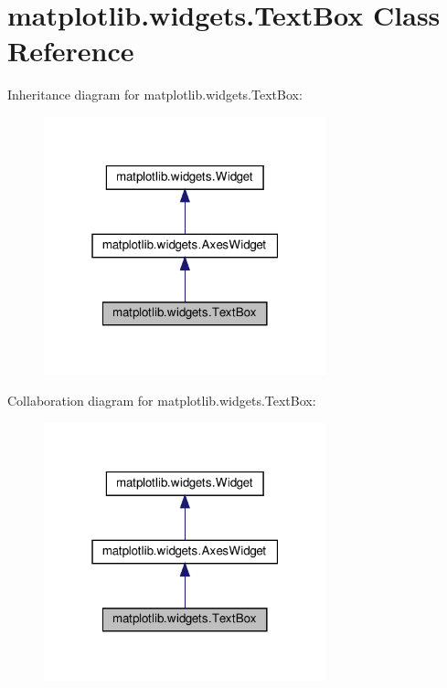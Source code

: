 \hypertarget{classmatplotlib_1_1widgets_1_1TextBox}{}\section{matplotlib.\+widgets.\+Text\+Box Class Reference}
\label{classmatplotlib_1_1widgets_1_1TextBox}


Inheritance diagram for matplotlib.\+widgets.\+Text\+Box\+:
\nopagebreak
\begin{figure}[H]
\begin{center}
\leavevmode
\includegraphics[width=232pt]{classmatplotlib_1_1widgets_1_1TextBox__inherit__graph}
\end{center}
\end{figure}


Collaboration diagram for matplotlib.\+widgets.\+Text\+Box\+:
\nopagebreak
\begin{figure}[H]
\begin{center}
\leavevmode
\includegraphics[width=232pt]{classmatplotlib_1_1widgets_1_1TextBox__coll__graph}
\end{center}
\end{figure}
